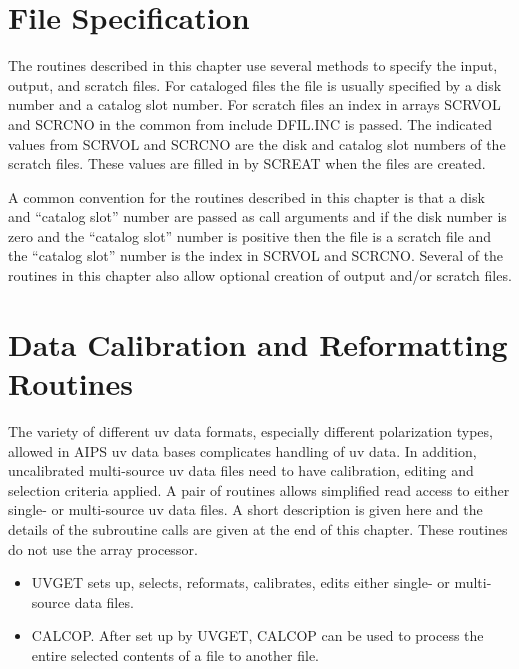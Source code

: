 \section{File Specification}

   The routines described in this chapter use several methods to
specify the input, output, and scratch files.  For cataloged files the
file is usually specified by a disk number and a catalog slot number.
For scratch files an index in arrays SCRVOL and SCRCNO in the
common from include DFIL.INC is passed.  The indicated values from
SCRVOL and SCRCNO are the disk and catalog slot numbers of the scratch
files.  These values are filled in by SCREAT  when the files are
created.

   A common convention for the routines described in this chapter is
that a disk and ``catalog slot'' number are passed as call arguments and
if the disk number is zero and the ``catalog slot'' number is positive
then the file is a scratch file and the ``catalog slot'' number is the
index in SCRVOL and SCRCNO.  Several of the routines in this chapter
also allow optional creation of output and/or scratch files.

\section{Data Calibration and Reformatting Routines}
The variety of different uv data formats, especially different
polarization types, allowed in AIPS uv data bases complicates handling
of uv data.  In addition, uncalibrated multi-source uv data
files need to have calibration, editing and selection criteria
applied.  A pair of routines allows simplified read access to either
single- or multi-source uv data files.  A short description is given
here and the details of the subroutine calls are given at the end of
this chapter.  These routines do not use the array processor.
\begin{itemize} %
\item {}
UVGET sets up, selects, reformats, calibrates, edits either single- or
multi-source data files.
\item CALCOP. After set up by UVGET, CALCOP can be used to process the
entire selected contents of a file to another file.

\end{itemize} %

